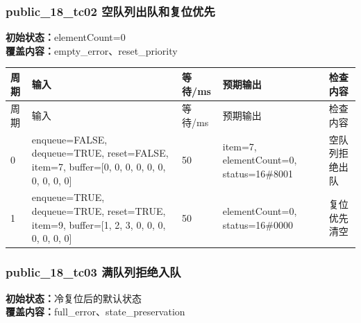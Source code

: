 \subsubsection{{\ttfamily public\_18\_tc02} 空队列出队和复位优先}

\noindent\textbf{初始状态：}elementCount=0\\

\textbf{覆盖内容：}empty\_error、reset\_priority

\begin{longtable}{L{1.0cm}L{4.7cm}L{1.4cm}L{4.0cm}L{2.1cm}}

\toprule

周期 & 输入 & 等待/ms & 预期输出 & 检查内容\\

\midrule

\endfirsthead

\toprule

周期 & 输入 & 等待/ms & 预期输出 & 检查内容\\

\midrule

\endhead

0 & enqueue=FALSE, dequeue=TRUE, reset=FALSE, item=7, buffer=[0, 0, 0, 0, 0, 0, 0, 0, 0, 0] & 50 & item=7, elementCount=0, status=16\#8001 & 空队列拒绝出队\\

1 & enqueue=TRUE, dequeue=TRUE, reset=TRUE, item=9, buffer=[1, 2, 3, 0, 0, 0, 0, 0, 0, 0] & 50 & elementCount=0, status=16\#0000 & 复位优先清空\\

\bottomrule

\end{longtable}

\subsubsection{{\ttfamily public\_18\_tc03} 满队列拒绝入队}

\noindent\textbf{初始状态：}冷复位后的默认状态\\

\textbf{覆盖内容：}full\_error、state\_preservation

